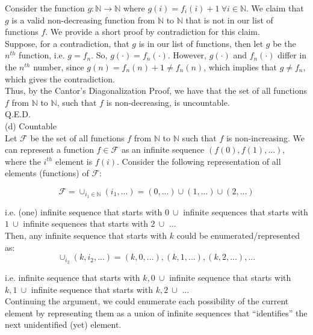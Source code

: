 \documentclass{article}
\begin{document}
Consider the function $g:\mathbb{N}\rightarrow\mathbb{N}$ where $g(i) = f_i(i) + 1\ \forall i\in\mathbb{N}$. We claim that $g$ is a valid non-decreasing function from $\mathbb{N}$ to $\mathbb{N}$ that is not in our list of functions $f$. We provide a short proof by contradiction for this claim. \\

Suppose, for a contradiction, that $g$ is in our list of functions, then let $g$ be the $n^{th}$ function, i.e. $g = f_n$. So, $g(\cdot) = f_n(\cdot)$. However, $g(\cdot)$ and $f_n(\cdot)$ differ in the $n^{th}$ number, since $g(n) = f_n(n) + 1\neq f_n(n)$, which implies that $g\neq f_n$, which gives the contradiction. \\

Thus, by the Cantor’s Diagonalization Proof, we have that the set of all functions $f$ from $\mathbb{N}$ to $\mathbb{N}$, such that $f$ is non-decreasing, is uncountable. \\

Q.E.D. \pagebreak \\
(d) Countable \\

Let $\mathscr{F}$ be the set of all functions $f$ from $\mathbb{N}$ to $\mathbb{N}$ such that $f$ is non-increasing.
We can represent a function $f\in\mathscr{F}$ as an infinite sequence $(f(0), f(1), ...)$, where the $i^{th}$ element is $f(i)$. Consider the following representation of all elements (functions) of $\mathscr{F}$:

$$\mathscr{F} = \cup_{i_1\in\mathbb{N}} (i_1, ...) = (0,...)\cup(1,...)\cup(2,...)$$

i.e. (one) infinite sequence that starts with $0\ \cup$ infinite sequences that starts with $1\ \cup$ infinite sequences that starts with $2\ \cup$ ... \\[.5cm]

Then, any infinite sequence that starts with $k$ could be enumerated/represented as:
$$\cup_{i_2} (k, i_2, ...) = (k, 0, ...), (k, 1, ...), (k, 2, ...), ...$$

i.e. infinite sequence that starts with $k, 0\ \cup$ infinite sequence that starts with $k, 1\ \cup$ infinite sequence that starts with $k, 2\ \cup$ ... \\[.5cm]

Continuing the argument, we could enumerate each possibility of the current element by representing them as a union of infinite sequences that ``identifies'' the next unidentified (yet) element. \\
\end{document}
